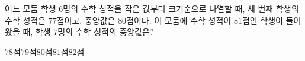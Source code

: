 어느 모둠 학생 $6$명의 수학 성적을 작은 값부터 크기순으로 나열할 때, 세 번째 학생의 수학 성적은 $77$점이고, 중앙값은 $80$점이다. 이 모둠에 수학 성적이 $81$점인 학생이 들어왔을 때, 학생 $7$명의 수학 성적의 중앙값은?
\begin{choices32}{$78$점}{$79$점}{$80$점}{$81$점}{$82$점}\end{choices32}
